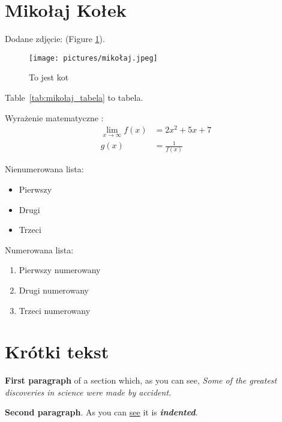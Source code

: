 \section{Mikołaj Kołek}
\label{sec:Mikołaj}

Dodane zdjęcie: (Figure \ref{fig:cat}).

\begin{figure}[htbp]
    \centering
    \texttt{[image: pictures/mikołaj.jpeg]} 
    \caption{To jest kot}
    \label{fig:cat}
\end{figure}

Table~\ref{tab:mikołaj_tabela} to tabela.



Wyrażenie matematyczne : 
\begin{align}
\lim_{{x \to \infty}} f(x) &= 2x^2 + 5x + 7 \\
g(x) &= \frac{1}{f(x)}
\end{align}

Nienumerowana lista:
\begin{itemize}
  \item Pierwszy
  \item Drugi
  \item Trzeci
\end{itemize}

Numerowana lista:
\begin{enumerate}
  \item Pierwszy numerowany
  \item Drugi numerowany
  \item Trzeci numerowany
\end{enumerate}

\setlength{\parindent}{20pt}

\section*{Krótki tekst}

\textbf{First paragraph} of a section which, as you can see, \textit{Some of the greatest \emph{discoveries} 
in science 
were made by accident.}

\textbf{Second paragraph}. As you can \underline{see} it is \textbf{\textit{indented}}.

